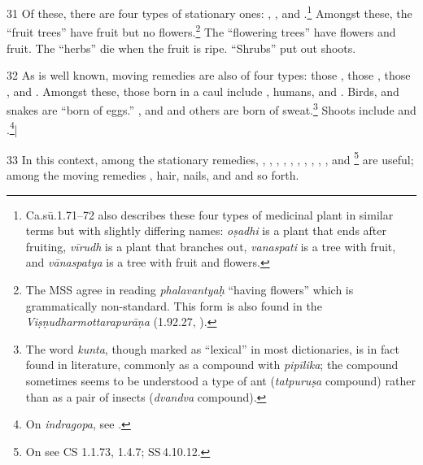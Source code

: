 \documentclass[12pt]{article}
\newcommand{\VN}[2]{%
SS\,#1}
\begin{document}
\begin{translation}
\item [31]  Of these, there are four types of stationary ones:
, ,
 and .\footnote{Ca.sū.1.71--72 
also
describes these four types of medicinal plant in similar terms but with slightly
differing names: \emph{oṣadhi} is a plant that ends after fruiting, \emph{vīrudh}
is a plant that branches out, \emph{vanaspati} is a tree with fruit, and
\emph{vānaspatya} is a tree with fruit and flowers.}
Amongst these, the “fruit trees” have fruit but no flowers.\footnote{The MSS agree 
in reading \emph{phalavantyaḥ} “having flowers” which is grammatically 
non-standard. This form is also found in the  \emph{Viṣṇudharmottarapurāṇa} 
(1.92.27, \cite[1.92.27][56r]{sarm-1912}).}  The “flowering trees” 
have flowers and fruit.  The “herbs” die when the fruit is ripe. “Shrubs” put out 
shoots.



   \item[32]  As is well known, moving remedies are also of four types: those
, those ,
those , and . Amongst
these, those born in a caul include , humans, and
.  Birds,  and
snakes are “born of eggs.” , 
and  and others are born of sweat.\footnote{The word
\emph{kunta}, though marked as “lexical” in most dictionaries, is in fact found
in literature, commonly as a compound with \emph{pipīlika}; the compound
sometimes seems to be understood a type of ant (\emph{tatpuruṣa} compound)
rather than as a pair of insects (\emph{dvandva} compound).}  Shoots include
 and .\footnote{On
\emph{indragopa}, see \cite{lien-1978}.}|

\item[33] In this context, among the stationary remedies, 
, 
, 
, 
,
,
,
,
,
,
, 
and
\footnote{On  see
CS 1.1.73, 1.4.7; \VN{4.10.12}{}.} 
are useful; among the moving remedies 
, hair, nails, and 
 and so forth. 


\end{translation}
\end{document}
